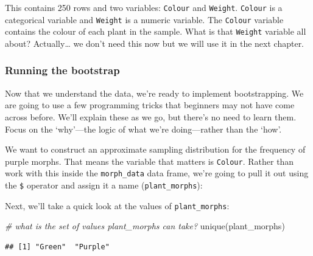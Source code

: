 \documentclass[
]{book}
\newenvironment{Shaded}{\begin{snugshade}}{\end{snugshade}}
\newcommand{\CommentTok}[1]{\textcolor[rgb]{0.56,0.35,0.01}{\textit{#1}}}
\newcommand{\FunctionTok}[1]{\textcolor[rgb]{0.00,0.00,0.00}{#1}}
\newcommand{\NormalTok}[1]{#1}
\newcommand{\OtherTok}[1]{\textcolor[rgb]{0.56,0.35,0.01}{#1}}
\newcommand{\SpecialCharTok}[1]{\textcolor[rgb]{0.00,0.00,0.00}{#1}}
\begin{document}
This contains 250 rows and two variables: \texttt{Colour} and \texttt{Weight}. \texttt{Colour} is a categorical variable and \texttt{Weight} is a numeric variable. The \texttt{Colour} variable contains the colour of each plant in the sample. What is that \texttt{Weight} variable all about? Actually\ldots{} we don't need this now but we will use it in the next chapter.

\hypertarget{running-the-bootstrap}{%
\subsubsection*{Running the bootstrap}\label{running-the-bootstrap}}

Now that we understand the data, we're ready to implement bootstrapping. We are going to use a few programming tricks that beginners may not have come across before. We'll explain these as we go, but there's no need to learn them. Focus on the `why'---the logic of what we're doing---rather than the `how'.

We want to construct an approximate sampling distribution for the frequency of purple morphs. That means the variable that matters is \texttt{Colour}. Rather than work with this inside the \texttt{morph\_data} data frame, we're going to pull it out using the \texttt{\$} operator and assign it a name (\texttt{plant\_morphs}):

\begin{Shaded}
\end{Shaded}

Next, we'll take a quick look at the values of \texttt{plant\_morphs}:

\begin{Shaded}
\begin{Highlighting}[]
\CommentTok{\# what is the set of values \textquotesingle{}plant\_morphs\textquotesingle{} can take?}
\FunctionTok{unique}\NormalTok{(plant\_morphs)}
\end{Highlighting}
\end{Shaded}

\begin{verbatim}
## [1] "Green"  "Purple"
\end{verbatim}
\end{document}
